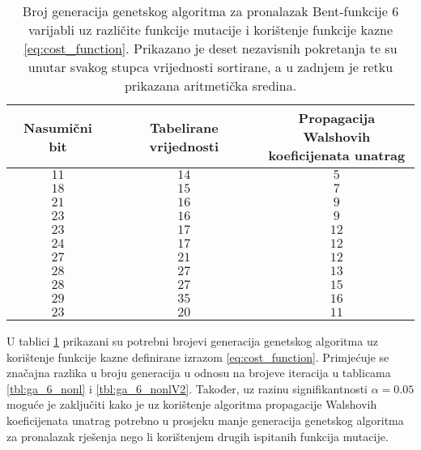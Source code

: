 \begin{table}[]
    \centering
    \captionsetup{justification=centering}
    \caption{Broj generacija genetskog algoritma za pronalazak Bent-funkcije $6$ varijabli uz različite funkcije mutacije i korištenje funkcije kazne \eqref{eq:cost_function}. Prikazano je deset nezavisnih pokretanja te su unutar svakog stupca vrijednosti sortirane, a u zadnjem je retku prikazana aritmetička sredina.}
    \begin{tabular}{ccc} \hline
        Nasumični bit & Tabelirane vrijednosti & \makecell{Propagacija Walshovih \\ koeficijenata unatrag} \\ \hline
        $11$ & $14$ &  $5$ \\
        $18$ & $15$ &  $7$ \\
        $21$ & $16$ &  $9$ \\
        $23$ & $16$ &  $9$ \\
        $23$ & $17$ & $12$ \\
        $24$ & $17$ & $12$ \\
        $27$ & $21$ & $12$ \\
        $28$ & $27$ & $13$ \\
        $28$ & $27$ & $15$ \\
        $29$ & $35$ & $16$ \\ \hline
        $23$ & $20$ & $11$
    \end{tabular}
    \label{tbl:ga_6_walshe}
\end{table}

U tablici \ref{tbl:ga_6_walshe} prikazani su potrebni brojevi generacija genetskog algoritma uz korištenje funkcije kazne definirane izrazom \eqref{eq:cost_function}.
Primjećuje se značajna razlika u broju generacija u odnosu na brojeve iteracija u tablicama \ref{tbl:ga_6_nonl} i \ref{tbl:ga_6_nonlV2}.
Također, uz razinu signifikantnosti $\alpha = 0.05$ moguće je zaključiti kako je uz korištenje algoritma propagacije Walshovih koeficijenata unatrag potrebno u prosjeku manje generacija genetskog algoritma za pronalazak rješenja nego li korištenjem drugih ispitanih funkcija mutacije.

